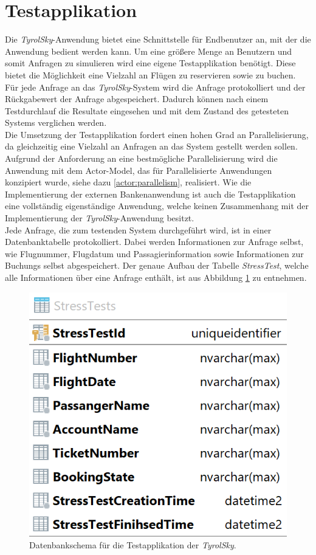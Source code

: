 \section{Testapplikation}
\label{subsec:implementation:TestApplikation} 
Die \textit{TyrolSky}-Anwendung bietet eine Schnittstelle für Endbenutzer an, mit der die Anwendung bedient werden kann. Um eine größere Menge an Benutzern und somit Anfragen zu simulieren wird eine eigene Testapplikation benötigt. Diese bietet die Möglichkeit eine Vielzahl an Flügen zu reservieren sowie zu buchen. Für jede Anfrage an das \textit{TyrolSky}-System wird die Anfrage protokolliert und der Rückgabewert der Anfrage abgespeichert. Dadurch können nach einem Testdurchlauf die Resultate eingesehen und mit dem Zustand des getesteten Systems verglichen werden. \\
Die Umsetzung der Testapplikation fordert einen hohen Grad an Parallelisierung, da gleichzeitig eine Vielzahl an Anfragen an das System gestellt werden sollen. Aufgrund der Anforderung an eine bestmögliche Parallelisierung wird die Anwendung mit dem Actor-Model, das für Parallelisierte Anwendungen konzipiert wurde, siehe dazu \ref{actor:parallelism}, realisiert. Wie die Implementierung der externen Bankenanwendung ist auch die Testapplikation eine vollständig eigenständige Anwendung, welche keinen Zusammenhang mit der Implementierung der \textit{TyrolSky}-Anwendung besitzt. \\
Jede Anfrage, die zum testenden System durchgeführt wird, ist in einer Datenbanktabelle protokolliert. Dabei werden Informationen zur Anfrage selbst, wie Flugnummer, Flugdatum und Passagierinformation sowie Informationen zur Buchungs selbst abgespeichert. Der genaue Aufbau der Tabelle \textit{StressTest}, welche alle Informationen über eine Anfrage enthält, ist aus Abbildung \ref{fig:implementation:stressTestDbSchema} zu entnehmen.
\begin{figure}
    \centering
    \includegraphics[width=0.4\linewidth]{gfx/implementation/stressTestDbSchema}
    \caption{Datenbankschema für die Testapplikation der \textit{TyrolSky}.}
    \label{fig:implementation:stressTestDbSchema}
\end{figure} 

